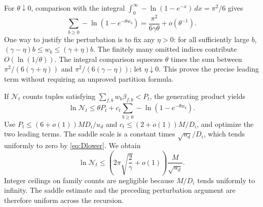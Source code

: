 \documentclass[11pt,letterpaper]{article}
\theoremstyle{definition}\newtheorem{definition}[theorem]{Definition}
\theoremstyle{remark}\newtheorem{remark}[theorem]{Remark}
\begin{document}
For $\theta\downarrow0$, comparison with the integral
$\int_0^\infty-\ln(1-e^{-x})\,dx=\pi^2/6$ gives
\begin{equation}\label{eq:partition-asymptotic}
 \sum_{b\ge0}-\ln(1-e^{-\theta w_b})
 =\frac{\pi^2}{6\gamma\theta}+o(\theta^{-1}).
\end{equation}
One way to justify the perturbation is to fix any $\eta>0$: for all
sufficiently large $b$, $(\gamma-\eta)b\le w_b\le(\gamma+\eta)b$.
The finitely many omitted indices contribute $O(\ln(1/\theta))$.
The integral comparison squeezes $\theta$ times the sum between
$\pi^2/(6(\gamma+\eta))$ and $\pi^2/(6(\gamma-\eta))$; let
$\eta\downarrow0$. This proves the precise leading term without
requiring an unproved partition formula.

If $\mathcal N_t$ counts tuples satisfying
$\sum_{f,b}w_b\beta_{f,b}<P_t$, the generating product yields
\[
 \ln\mathcal N_t\le\theta P_t+
 c_t\sum_{b\ge0}-\ln(1-e^{-\theta w_b}).
\]
Use $P_t\le(6+o(1))MD_i/u_d$ and
$c_t\le(2+o(1))M/D_i$, and optimize the two leading terms.
The saddle scale is a constant times $\sqrt{u_d}/D_i$, which tends
uniformly to zero by \eqref{eq:Dlower}. We obtain
\begin{equation}\label{eq:localentropy}
 \ln\mathcal N_t\le
 \left(2\pi\sqrt{\frac2\gamma}+o(1)\right)
 \frac{M}{\sqrt{u_d}}.
\end{equation}
Integer ceilings on family counts are negligible because $M/D_i$
tends uniformly to infinity. The saddle estimate and the preceding
perturbation argument are therefore uniform across the recursion.
\end{document}
